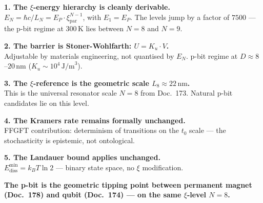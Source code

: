 	\begin{conclusionBox}
		\textbf{1. The $\xi$-energy hierarchy is cleanly derivable.}\\
		$E_N = \hbar c/L_N = E_P\cdot\xi_\text{par}^{N-1}$, with $E_1 = E_P$.
		The levels jump by a factor of $7500$ --- the p-bit regime at
		300\,K lies between $N=8$ and $N=9$.
		
		\textbf{2. The barrier is Stoner-Wohlfarth: $U = K_u \cdot V$.}\\
		Adjustable by materials engineering, not quantised by $E_N$.
		p-bit regime at $D \approx 8$--$20\,\text{nm}$ ($K_u \sim 10^4\,\text{J/m}^3$).
		
		\textbf{3. The $\xi$-reference is the geometric scale $L_8 \approx 22\,\text{nm}$.}\\
		This is the universal resonator scale $N=8$ from Doc.~173.
		Natural p-bit candidates lie on this level.
		
		\textbf{4. The Kramers rate remains formally unchanged.}\\
		FFGFT contribution: determinism of transitions on the $t_0$ scale ---
		the stochasticity is epistemic, not ontological.
		
		\textbf{5. The Landauer bound applies unchanged.}\\
		$E_\text{diss}^\text{min} = k_BT\ln 2$ --- binary state space,
		no $\xi$ modification.
		
		\vspace{0.5em}
		\textbf{The p-bit is the geometric tipping point between permanent magnet
			(Doc.~178) and qubit (Doc.~174) --- on the same $\xi$-level $N=8$.}
	\end{conclusionBox}
	
